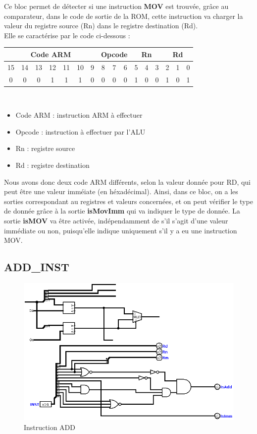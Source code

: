 \documentclass[a4paper]{article} %
\begin{document}
Ce bloc permet de détecter si une instruction \textbf{MOV} est trouvée, grâce au comparateur, dans le code de sortie de la ROM, cette instruction va charger la valeur du registre source (Rn) dans le registre destination (Rd).\\
Elle se caractérise par le code ci-dessous : 
\\
\begin{tabular}{|ccccccc|ccc|ccc|ccc|}
    \hline
    \multicolumn{7}{|c|}{Code ARM}  & \multicolumn{3}{|c|}{Opcode} & \multicolumn{3}{|c|}{Rn} & \multicolumn{3}{|c|}{Rd}\\
    \hline
    15 & 14 & 13 & 12 & 11 & 10 & 9 & 8 & 7 & 6                    & 5 & 4 & 3                & 2 & 1 & 0 \\
    \hline
    0  & 0  & 0  & 1  & 1  & 1  & 0 & 0 & 0 & 0                    & 1 & 0 & 0                & 1 & 0 & 1 \\
    \hline     
    \end{tabular}
\\

\begin{itemize}
    \item     Code ARM : instruction ARM à effectuer
    \item     Opcode : instruction à effectuer par l'ALU
    \item     Rn : registre source
    \item     Rd : registre destination
\end{itemize}

\medskip
Nous avons donc deux code ARM différents, selon la valeur donnée pour RD, qui peut être une valeur imméiate (en héxadécimal). Ainsi, dans ce bloc, on a les sorties correspondant au registres et valeurs concernées, et on peut vérifier le type de donnée grâce à la sortie \textbf{isMovImm} qui va indiquer le type de donnée. La sortie \textbf{isMOV} va être activée, indépendamment de s'il s'agit d'une valeur immédiate ou non, puisqu'elle indique uniquement s'il y a eu une instruction MOV.


\subsection{ADD\_INST} \label{addinst}
\begin{figure}[H]
    \centering
    \includegraphics[width=.8\textwidth]{src/ADD_INST.png}
    \caption{Instruction ADD}
    \label{add_img}
\end{figure}
\end{document}
